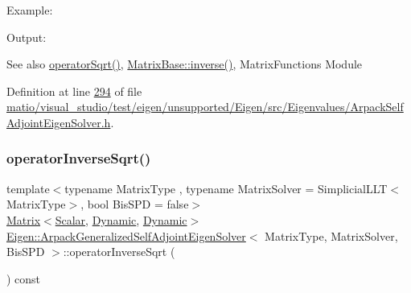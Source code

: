 Example\+: 
\begin{DoxyCodeInclude}
\end{DoxyCodeInclude}
 Output\+: 
\begin{DoxyVerbInclude}
\end{DoxyVerbInclude}


\begin{DoxySeeAlso}{See also}
\hyperlink{class_eigen_1_1_arpack_generalized_self_adjoint_eigen_solver_a7522aad061ebccc065b254c0bc67d3b0}{operator\+Sqrt()}, \hyperlink{group___core___module_a7712eb69e8ea3c8f7b8da1c44dbdeebf}{Matrix\+Base\+::inverse()}, Matrix\+Functions Module 
\end{DoxySeeAlso}


Definition at line \hyperlink{matio_2visual__studio_2test_2eigen_2unsupported_2_eigen_2src_2_eigenvalues_2_arpack_self_adjoint_eigen_solver_8h_source_l00294}{294} of file \hyperlink{matio_2visual__studio_2test_2eigen_2unsupported_2_eigen_2src_2_eigenvalues_2_arpack_self_adjoint_eigen_solver_8h_source}{matio/visual\+\_\+studio/test/eigen/unsupported/\+Eigen/src/\+Eigenvalues/\+Arpack\+Self\+Adjoint\+Eigen\+Solver.\+h}.

\mbox{\label{class_eigen_1_1_arpack_generalized_self_adjoint_eigen_solver_ad55f052b675f1deaea220d0cc225622a}} 
\subsubsection{\texorpdfstring{operator\+Inverse\+Sqrt()}{operatorInverseSqrt()}\hspace{0.1cm}{\footnotesize\ttfamily [2/2]}}
{\footnotesize\ttfamily template$<$typename Matrix\+Type , typename Matrix\+Solver  = Simplicial\+L\+L\+T$<$\+Matrix\+Type$>$, bool Bis\+S\+PD = false$>$ \\
\hyperlink{group___core___module_class_eigen_1_1_matrix}{Matrix}$<$\hyperlink{class_eigen_1_1_arpack_generalized_self_adjoint_eigen_solver_ab1182405bfe87a505d4b7a8311c661ec}{Scalar}, \hyperlink{namespace_eigen_ad81fa7195215a0ce30017dfac309f0b2}{Dynamic}, \hyperlink{namespace_eigen_ad81fa7195215a0ce30017dfac309f0b2}{Dynamic}$>$ \hyperlink{class_eigen_1_1_arpack_generalized_self_adjoint_eigen_solver}{Eigen\+::\+Arpack\+Generalized\+Self\+Adjoint\+Eigen\+Solver}$<$ Matrix\+Type, Matrix\+Solver, Bis\+S\+PD $>$\+::operator\+Inverse\+Sqrt (\begin{DoxyParamCaption}{ }\end{DoxyParamCaption}) const\hspace{0.3cm}{\ttfamily [inline]}}



